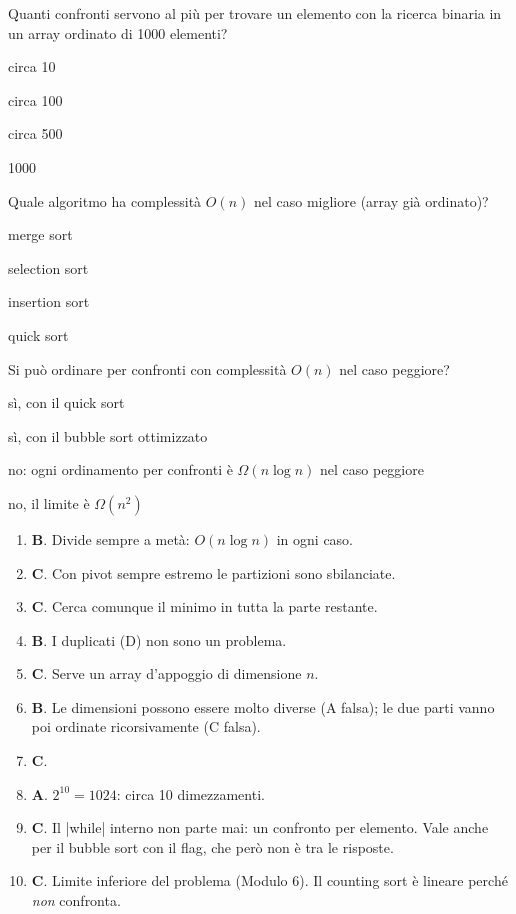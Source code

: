 \begin{quiz}{Quanti confronti servono al più per trovare un elemento con la ricerca binaria in un array ordinato di 1000 elementi?}
  \item circa 10
  \item circa 100
  \item circa 500
  \item 1000
\end{quiz}

\begin{quiz}{Quale algoritmo ha complessità $O(n)$ nel caso migliore (array già ordinato)?}
  \item merge sort
  \item selection sort
  \item insertion sort
  \item quick sort
\end{quiz}

\begin{quiz}{Si può ordinare per confronti con complessità $O(n)$ nel caso peggiore?}
  \item sì, con il quick sort
  \item sì, con il bubble sort ottimizzato
  \item no: ogni ordinamento per confronti è $\Omega(n \log n)$ nel caso peggiore
  \item no, il limite è $\Omega(n^2)$
\end{quiz}

\begin{soluzione}
\begin{enumerate}[label=\textbf{\arabic*.}]
  \item \textbf{B}. Divide sempre a metà: $O(n \log n)$ in ogni caso.
  \item \textbf{C}. Con pivot sempre estremo le partizioni sono sbilanciate.
  \item \textbf{C}. Cerca comunque il minimo in tutta la parte restante.
  \item \textbf{B}. I duplicati (D) non sono un problema.
  \item \textbf{C}. Serve un array d'appoggio di dimensione $n$.
  \item \textbf{B}. Le dimensioni possono essere molto diverse (A falsa); le due
        parti vanno poi ordinate ricorsivamente (C falsa).
  \item \textbf{C}.
  \item \textbf{A}. $2^{10} = 1024$: circa 10 dimezzamenti.
  \item \textbf{C}. Il \cc|while| interno non parte mai: un confronto per elemento.
        Vale anche per il bubble sort con il flag, che però non è tra le risposte.
  \item \textbf{C}. Limite inferiore del problema (Modulo 6). Il counting sort è
        lineare perché \emph{non} confronta.
\end{enumerate}
\end{soluzione}

